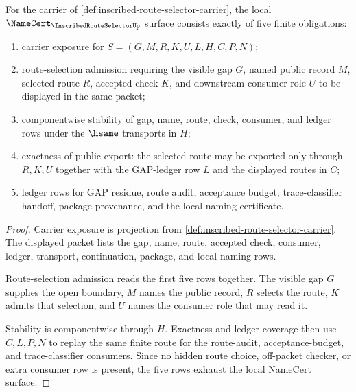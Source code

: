 \begin{theorem}
\label{thm:inscribed-route-selector-namecert-obligations}
For the carrier of \autoref{def:inscribed-route-selector-carrier}, the local $\NameCert_{\InscribedRouteSelectorUp}$ surface consists exactly of five finite obligations:
\begin{enumerate}
\item carrier exposure for $S=(G,M,R,K,U,L,H,C,P,N)$;
\item route-selection admission requiring the visible gap $G$, named public record $M$, selected route $R$, accepted check $K$, and downstream consumer role $U$ to be displayed in the same packet;
\item componentwise stability of gap, name, route, check, consumer, and ledger rows under the $\hsame$ transports in $H$;
\item exactness of public export: the selected route may be exported only through $R,K,U$ together with the GAP-ledger row $L$ and the displayed routes in $C$;
\item ledger rows for GAP residue, route audit, acceptance budget, trace-classifier handoff, package provenance, and the local naming certificate.
\end{enumerate}
\end{theorem}
\begin{proof}
Carrier exposure is projection from \autoref{def:inscribed-route-selector-carrier}. The displayed packet lists the gap, name, route, accepted check, consumer, ledger, transport, continuation, package, and local naming rows.

Route-selection admission reads the first five rows together. The visible gap $G$ supplies the open boundary, $M$ names the public record, $R$ selects the route, $K$ admits that selection, and $U$ names the consumer role that may read it.

Stability is componentwise through $H$. Exactness and ledger coverage then use $C,L,P,N$ to replay the same finite route for the route-audit, acceptance-budget, and trace-classifier consumers. Since no hidden route choice, off-packet checker, or extra consumer row is present, the five rows exhaust the local NameCert surface.
\end{proof}


